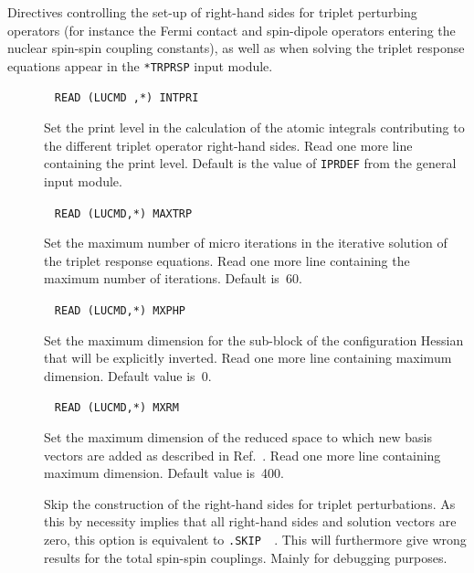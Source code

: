 Directives controlling the set-up of right-hand sides for triplet
perturbing operators (for instance the Fermi contact and spin-dipole
operators entering the nuclear spin-spin coupling
constants),
as well as when solving the triplet response equations appear in the
\verb|*TRPRSP| input module.

\begin{description}
\item[]\verb| |\newline
\verb|READ (LUCMD ,*) INTPRI|

Set the print level in the calculation of the atomic integrals
contributing to the different triplet operator right-hand sides. Read
one more line containing the print level. Default is the value
of \verb|IPRDEF| from the general input module.

\item[]\verb| |\newline
\verb|READ (LUCMD,*) MAXTRP|

Set the maximum number of micro iterations in the iterative solution of
the triplet response equations. Read one more line containing the
maximum number of iterations. Default is~60.

\item[]\verb| |\newline
\verb|READ (LUCMD,*) MXPHP|

Set the maximum dimension for the sub-block of the configuration
Hessian that will be explicitly inverted. Read one more line
containing maximum dimension. Default value is~0.

\item[]\verb| |\newline
\verb|READ (LUCMD,*) MXRM|

Set the maximum dimension of the reduced space to which new basis
vectors are added as described in Ref.~\cite{tuhjahjajpjjcp84}. Read
one more line containing maximum dimension. Default value is~400.

\item[] Skip the construction of the right-hand sides
for triplet perturbations. As this by necessity implies that all
right-hand sides and solution vectors are zero, this option is
equivalent to \verb|.SKIP  |. This will furthermore give wrong results
for the total spin-spin couplings. Mainly for debugging purposes.


\end{description}
